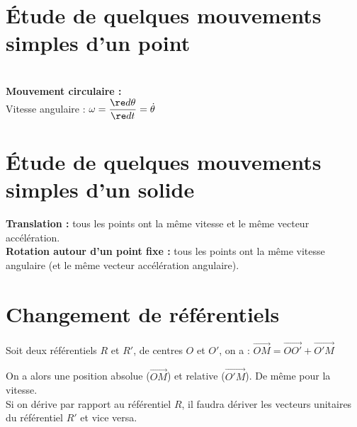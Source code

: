 \documentclass[13pt, twoside, a4paper, french]{report}
\begin{document}
    \section{Étude de quelques mouvements simples d’un point}\label{sec:etude-de-quelques-mouvements-simples-dun-point}

        \\
        \textbf{Mouvement circulaire :}\\
        Vitesse angulaire : $\omega = \dfrac{\re d \theta}{\re d t} = \dot \theta$


    \section{Étude de quelques mouvements simples d’un solide}\label{sec:etude-de-quelques-mouvements-simples-dun-solide}

        \textbf{Translation :} tous les points ont la même vitesse et le même vecteur accélération.\\

        \textbf{Rotation autour d'un point fixe :} tous les points ont la même vitesse angulaire (et le même vecteur accélération angulaire).


    \section{Changement de référentiels}\label{sec:changement-de-referentiels}

        Soit deux référentiels $R$ et $R'$, de centres $O$ et $O'$, on a : $\vec{OM} = \vec{OO'} + \vec{O'M}$

        On a alors une position absolue ($\vec{OM}$) et relative ($\vec{O'M}$).
        De même pour la vitesse.\\

        Si on dérive par rapport au référentiel $R$, il faudra dériver les vecteurs unitaires du référentiel $R'$ et vice versa.\\
\end{document}
